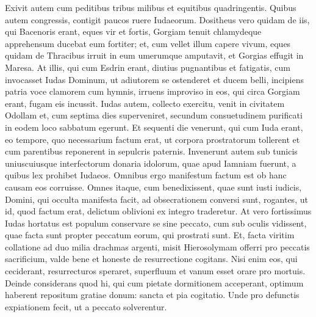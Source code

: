 \begin{biblechapter}
\begin{biblechapter}
\begin{biblechapter}
\begin{biblechapter}
\begin{biblechapter}
\begin{biblechapter}
\begin{biblechapter}
\begin{biblechapter}
\begin{biblechapter}
\begin{biblechapter}
\begin{biblechapter}
\begin{biblechapter}
\verse Exivit autem cum peditibus tribus milibus et equitibus quadringentis. 
\verse Quibus autem congressis, contigit paucos ruere Iudaeorum. 
 \verse Dositheus vero quidam de iis, qui Bacenoris erant, eques vir et fortis, Gorgiam tenuit chlamydeque apprehensum ducebat eum fortiter; et, cum vellet illum capere vivum, eques quidam de Thracibus irruit in eum umerumque amputavit, et Gorgias effugit in Maresa. 
\verse At illis, qui cum Esdrin erant, diutius pugnantibus et fatigatis, cum invocasset Iudas Dominum, ut adiutorem se ostenderet et ducem belli, 
\verse incipiens patria voce clamorem cum hymnis, irruens improviso in eos, qui circa Gorgiam erant, fugam eis incussit.
 \verse Iudas autem, collecto exercitu, venit in civitatem Odollam et, cum septima dies superveniret, secundum consuetudinem purificati in eodem loco sabbatum egerunt. 
\verse Et sequenti die venerunt, qui cum Iuda erant, eo tempore, quo necessarium factum erat, ut corpora prostratorum tollerent et cum parentibus reponerent in sepulcris paternis. 
\verse Invenerunt autem sub tunicis uniuscuiusque interfectorum donaria idolorum, quae apud Iamniam fuerunt, a quibus lex prohibet Iudaeos. Omnibus ergo manifestum factum est ob hanc causam eos corruisse.
 \verse Omnes itaque, cum benedixissent, quae sunt iusti iudicis, Domini, qui occulta manifesta facit, 
\verse ad obsecrationem conversi sunt, rogantes, ut id, quod factum erat, delictum oblivioni ex integro traderetur. At vero fortissimus Iudas hortatus est populum conservare se sine peccato, cum sub oculis vidissent, quae facta sunt propter peccatum eorum, qui prostrati sunt. 
\verse Et, facta viritim collatione ad duo milia drachmas argenti, misit Hierosolymam offerri pro peccatis sacrificium, valde bene et honeste de resurrectione cogitans. 
\verse Nisi enim eos, qui ceciderant, resurrecturos speraret, superfluum et vanum esset orare pro mortuis. 
\verse Deinde considerans quod hi, qui cum pietate dormitionem acceperant, optimum haberent repositum gratiae donum: 
\verse sancta et pia cogitatio. Unde pro defunctis expiationem fecit, ut a peccato solverentur.
 

\end{biblechapter}
\end{biblechapter}
\end{biblechapter}
\end{biblechapter}
\end{biblechapter}
\end{biblechapter}
\end{biblechapter}
\end{biblechapter}
\end{biblechapter}
\end{biblechapter}
\end{biblechapter}
\end{biblechapter}
